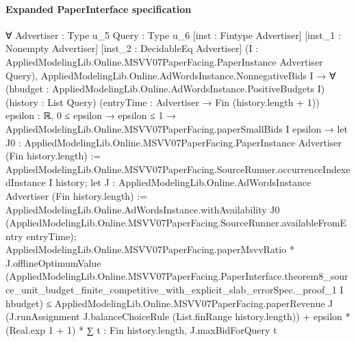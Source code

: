 \documentclass[10pt]{article}
\begin{document}
\paragraph{Expanded PaperInterface specification}
\begin{ReviewVerbatim}
∀ {Advertiser : Type u_5} {Query : Type u_6} [inst : Fintype Advertiser] [inst_1 : Nonempty Advertiser]
  [inst_2 : DecidableEq Advertiser] (I : AppliedModelingLib.Online.MSVV07PaperFacing.PaperInstance Advertiser Query),
  AppliedModelingLib.Online.AdWordsInstance.NonnegativeBids I →
    ∀ (hbudget : AppliedModelingLib.Online.AdWordsInstance.PositiveBudgets I) (history : List Query)
      (entryTime : Advertiser → Fin (history.length + 1)) {epsilon : ℝ},
      0 ≤ epsilon →
        epsilon ≤ 1 →
          AppliedModelingLib.Online.MSVV07PaperFacing.paperSmallBids I epsilon →
            let J0 : AppliedModelingLib.Online.MSVV07PaperFacing.PaperInstance Advertiser (Fin history.length) :=
              AppliedModelingLib.Online.MSVV07PaperFacing.SourceRunner.occurrenceIndexedInstance I history;
            let J : AppliedModelingLib.Online.AdWordsInstance Advertiser (Fin history.length) :=
              AppliedModelingLib.Online.AdWordsInstance.withAvailability J0
                (AppliedModelingLib.Online.MSVV07PaperFacing.SourceRunner.availableFromEntry entryTime);
            AppliedModelingLib.Online.MSVV07PaperFacing.paperMsvvRatio *
                J.offlineOptimumValue
                  (AppliedModelingLib.Online.MSVV07PaperFacing.PaperInterface.theorem8_source_unit_budget_finite_competitive_with_explicit_slab_errorSpec._proof_1
                    I hbudget) ≤
              AppliedModelingLib.Online.MSVV07PaperFacing.paperRevenue J
                  (J.runAssignment J.balanceChoiceRule (List.finRange history.length)) +
                epsilon * (Real.exp 1 + 1) * ∑ t : Fin history.length, J.maxBidForQuery t
\end{ReviewVerbatim}
\end{document}
